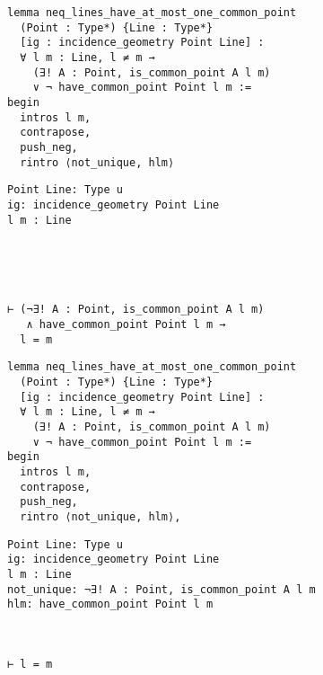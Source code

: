 \begin{frame}[fragile]
	\begin{multicols}{2}
		\begin{lstlisting}
lemma neq_lines_have_at_most_one_common_point 
  (Point : Type*) {Line : Type*} 
  [ig : incidence_geometry Point Line] :
  ∀ l m : Line, l ≠ m → 
    (∃! A : Point, is_common_point A l m) 
    ∨ ¬ have_common_point Point l m := 
begin
  intros l m,
  contrapose,
  push_neg,
  rintro ⟨not_unique, hlm⟩
\end{lstlisting}
		\columnbreak
		\begin{lstlisting}
Point Line: Type u
ig: incidence_geometry Point Line
l m : Line





⊢ (¬∃! A : Point, is_common_point A l m) 
   ∧ have_common_point Point l m → 
  l = m
		\end{lstlisting}
	\end{multicols}
\end{frame}










\begin{frame}[fragile]
	\begin{multicols}{2}
		\begin{lstlisting}
lemma neq_lines_have_at_most_one_common_point 
  (Point : Type*) {Line : Type*} 
  [ig : incidence_geometry Point Line] :
  ∀ l m : Line, l ≠ m → 
    (∃! A : Point, is_common_point A l m) 
    ∨ ¬ have_common_point Point l m := 
begin
  intros l m,
  contrapose,
  push_neg,
  rintro ⟨not_unique, hlm⟩,
\end{lstlisting}
		\columnbreak
		\begin{lstlisting}
Point Line: Type u
ig: incidence_geometry Point Line
l m : Line
not_unique: ¬∃! A : Point, is_common_point A l m
hlm: have_common_point Point l m



⊢ l = m
		\end{lstlisting}
	\end{multicols}
\end{frame}










